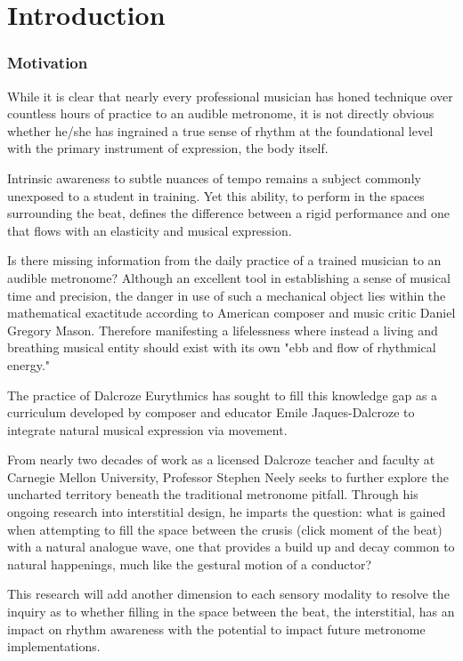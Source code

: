 
\chapter{Introduction} \label{secIntro}
\subsection{Motivation}
While it is clear that nearly every professional musician has honed technique over countless hours of practice to an audible metronome, it is not directly obvious whether he/she has ingrained a true sense of rhythm at the foundational level with the primary instrument of expression, the body itself.

Intrinsic awareness to subtle nuances of tempo remains a subject commonly unexposed to a student in training. Yet this ability, to perform in the spaces surrounding the beat, defines the difference between a rigid performance and one that flows with an elasticity and musical expression.

Is there missing information from the daily practice of a trained musician to an audible metronome? Although an excellent tool in establishing a sense of musical time and precision, the danger in use of such a mechanical object lies within the mathematical exactitude according to American composer and music critic Daniel Gregory Mason. Therefore manifesting a lifelessness where instead a living and breathing musical entity should exist with its own "ebb and flow of rhythmical energy."\cite{fitts2008new}

The practice of Dalcroze Eurythmics has sought to fill this knowledge gap as a curriculum developed by composer and educator Emile Jaques-Dalcroze to integrate natural musical expression via movement.  

From nearly two decades of work as a licensed Dalcroze teacher and faculty at Carnegie Mellon University, Professor Stephen Neely seeks to further explore the uncharted territory beneath the traditional metronome pitfall. Through his ongoing research into interstitial design, he imparts the question: what is gained when attempting to fill the space between the crusis (click moment of the beat) with a natural analogue wave, one that provides a build up and decay common to natural happenings, much like the gestural motion of a conductor?

This research will add another dimension to each sensory modality to resolve the inquiry as to whether filling in the space between the beat, the interstitial, has an impact on rhythm awareness with the potential to impact future metronome implementations. 

